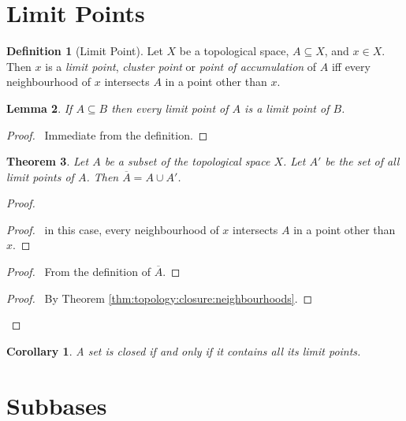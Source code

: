 \documentclass{report}
\let\qed\relax
\newtheorem{lm}{Lemma}[section]
\newtheorem{thm}[lm]{Theorem}
\newtheorem{cor}{Corollary}[lm]
\theoremstyle{definition}
\newtheorem{df}[lm]{Definition}
\begin{document}
  \section{Limit Points}

  \begin{df}[Limit Point]
    Let $X$ be a topological space, $A \subseteq X$, and $x \in X$. Then $x$ is
    a
    \emph{limit point}, \emph{cluster point} or \emph{point of accumulation} of
    $A$ iff every neighbourhood of $x$ intersects $A$ in a point other than $x$.
  \end{df}

  \begin{lm}
    \label{lm:topology:limit_point:subset}
    If $A \subseteq B$ then every limit point of $A$ is a limit point of $B$.
  \end{lm}

  \begin{proof}
    \pf\ Immediate from the definition. \qed
  \end{proof}

  \begin{thm}
    Let $A$ be a subset of the topological space $X$. Let $A'$ be the set of
    all
    limit points of $A$. Then $\overline{A} = A \cup A'$.
  \end{thm}

  \begin{proof}
    \pf
    \begin{proof}
      \pf\ in this case, every neighbourhood of $x$ intersects $A$ in a point
      other than $x$.
    \end{proof}
    \begin{proof}
      \pf\ From the definition of $\overline{A}$.
    \end{proof}
    \begin{proof}
      \pf\ By Theorem \ref{thm:topology:closure:neighbourhoods}.
    \end{proof}
    \qed
  \end{proof}

  \begin{cor}
    \label{cor:topology:limit_point:closed}
    A set is closed if and only if it contains all its limit points.
  \end{cor}

  \section{Subbases}
\end{document}
